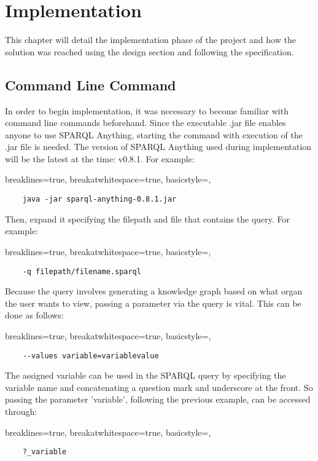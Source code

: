  \chapter{Implementation}
This chapter will detail the implementation phase of the project and how the solution was reached using the design section and following the specification. 

\section{Command Line Command}
\hspace*{0.5cm} In order to begin implementation, it was necessary to become familiar with command line commands beforehand. Since the executable .jar file enables anyone to use SPARQL Anything, starting the command with execution of the .jar file is needed. The version of SPARQL Anything used during implementation will be the latest at the time: v0.8.1. For example:

\lstset
{
    breaklines=true,
    breakatwhitespace=true,
    basicstyle=\ttfamily,
}
\begin{lstlisting}
    java -jar sparql-anything-0.8.1.jar 
\end{lstlisting}

\noindent Then, expand it specifying the filepath and file that contains the query. For example:

\lstset
{
    breaklines=true,
    breakatwhitespace=true,
    basicstyle=\ttfamily,
}
\begin{lstlisting}
    -q filepath/filename.sparql
\end{lstlisting}

\noindent Because the query involves generating a knowledge graph based on what organ the user wants to view, passing a parameter via the query is vital. This can be done as follows:

\lstset
{
    breaklines=true,
    breakatwhitespace=true,
    basicstyle=\ttfamily,
}
\begin{lstlisting}
    --values variable=variablevalue
\end{lstlisting}

\noindent The assigned variable can be used in the SPARQL query by specifying the variable name and concatenating a question mark and underscore at the front. So passing the parameter 'variable', following the previous example, can be accessed through:

\lstset
{
    breaklines=true,
    breakatwhitespace=true,
    basicstyle=\ttfamily,
}
\begin{lstlisting}
    ?_variable
\end{lstlisting}

